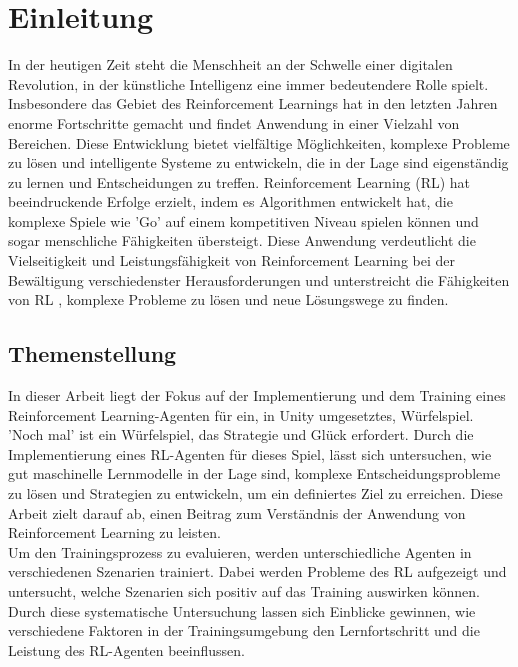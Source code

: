 
\chapter{Einleitung}

In der heutigen Zeit steht die Menschheit an der Schwelle einer digitalen Revolution, in der künstliche Intelligenz eine immer bedeutendere Rolle spielt. Insbesondere das Gebiet des Reinforcement Learnings hat in den letzten Jahren enorme Fortschritte gemacht und findet Anwendung in einer Vielzahl von Bereichen. Diese Entwicklung bietet vielfältige Möglichkeiten, komplexe Probleme zu lösen und intelligente Systeme zu entwickeln, die in der Lage sind eigenständig zu lernen und Entscheidungen zu treffen. Reinforcement Learning (RL) hat beeindruckende Erfolge erzielt, indem es Algorithmen entwickelt hat, die komplexe Spiele wie 'Go' auf einem kompetitiven Niveau spielen können und sogar menschliche Fähigkeiten übersteigt. Diese Anwendung verdeutlicht die Vielseitigkeit und Leistungsfähigkeit von Reinforcement Learning bei der Bewältigung verschiedenster Herausforderungen und unterstreicht die Fähigkeiten von RL , komplexe Probleme zu lösen und neue Lösungswege zu finden.\cite{hui_alphago_2018, noauthor_alphago_2020} 

\section{Themenstellung}
In dieser Arbeit liegt der Fokus auf der Implementierung und dem Training eines Reinforcement Learning-Agenten für ein, in Unity umgesetztes, Würfelspiel. 'Noch mal' ist ein Würfelspiel, das Strategie und Glück erfordert.  Durch die Implementierung eines RL-Agenten für dieses Spiel, lässt sich untersuchen, wie gut maschinelle Lernmodelle in der Lage sind, komplexe Entscheidungsprobleme zu lösen und Strategien zu entwickeln, um ein definiertes Ziel zu erreichen. Diese Arbeit zielt darauf ab, einen Beitrag zum Verständnis der Anwendung von Reinforcement Learning zu leisten. \\
Um den Trainingsprozess zu evaluieren, werden unterschiedliche Agenten in verschiedenen Szenarien trainiert. Dabei werden Probleme des RL aufgezeigt und untersucht, welche Szenarien sich positiv auf das Training auswirken können. Durch diese systematische Untersuchung lassen sich Einblicke gewinnen, wie verschiedene Faktoren in der  Trainingsumgebung den Lernfortschritt und die Leistung des RL-Agenten beeinflussen.

